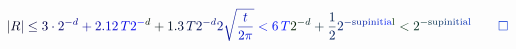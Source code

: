 \documentclass[12pt]{article}
\begin{document}
\makeatletter
\renewcommand*{\@textcolor}[3]{%
  \protect\leavevmode
  \begingroup
    \color#1{#2}#3%
  \endgroup
}
\makeatother
\begin{displaymath}
\mathcolor[RGB]{0,0,15}{|} \mathcolor[RGB]{0,0,30}{R} \mathcolor[RGB]{0,0,45}{|} \mathcolor[RGB]{0,0,60}{\leq} \mathcolor[RGB]{0,0,75}{3} \mathcolor[RGB]{0,0,90}{\cdot} \mathcolor[RGB]{0,0,105}{2} ^ { \mathcolor[RGB]{0,0,120}{-} \mathcolor[RGB]{0,0,135}{d} } \mathcolor[RGB]{0,0,150}{+} \mathcolor[RGB]{0,0,165}{2} \mathcolor[RGB]{0,0,180}{.} \mathcolor[RGB]{0,0,195}{1} \mathcolor[RGB]{0,0,210}{2} \, \mathcolor[RGB]{0,0,225}{T} \mathcolor[RGB]{0,0,240}{2} ^ { \mathcolor[RGB]{0,0,255}{-} \mathcolor[RGB]{0,15,0}{d} } \mathcolor[RGB]{0,15,15}{+} \mathcolor[RGB]{0,15,30}{1} \mathcolor[RGB]{0,15,45}{.} \mathcolor[RGB]{0,15,60}{3} \, \mathcolor[RGB]{0,15,75}{T} \mathcolor[RGB]{0,15,90}{2} ^ { \mathcolor[RGB]{0,15,105}{-} \mathcolor[RGB]{0,15,120}{d} } \mathcolor[RGB]{0,15,135}{2} \mathcolor[RGB]{0,15,150}{\sqrt { \mathcolor[RGB]{0,15,165}{\frac { \mathcolor[RGB]{0,15,180}{t} } { \mathcolor[RGB]{0,15,195}{2} \mathcolor[RGB]{0,15,210}{\pi} } } } } \mathcolor[RGB]{0,15,225}{<} \mathcolor[RGB]{0,15,240}{6} \, \mathcolor[RGB]{0,15,255}{T} \mathcolor[RGB]{0,30,0}{2} ^ { \mathcolor[RGB]{0,30,15}{-} \mathcolor[RGB]{0,30,30}{d} } \mathcolor[RGB]{0,30,45}{+} \mathcolor[RGB]{0,30,60}{\frac { \mathcolor[RGB]{0,30,75}{1} } { \mathcolor[RGB]{0,30,90}{2} } } \mathcolor[RGB]{0,30,105}{2} ^ { \mathcolor[RGB]{0,30,120}{-} \mathrm { \mathcolor[RGB]{0,30,135}{s} \mathcolor[RGB]{0,30,150}{u} \mathcolor[RGB]{0,30,165}{p} \mathcolor[RGB]{0,30,180}{i} \mathcolor[RGB]{0,30,195}{n} \mathcolor[RGB]{0,30,210}{i} \mathcolor[RGB]{0,30,225}{t} \mathcolor[RGB]{0,30,240}{i} \mathcolor[RGB]{0,30,255}{a} \mathcolor[RGB]{0,45,0}{l} } } \mathcolor[RGB]{0,45,15}{<} \mathcolor[RGB]{0,45,30}{2} ^ { \mathcolor[RGB]{0,45,45}{-} \mathrm { \mathcolor[RGB]{0,45,60}{s} \mathcolor[RGB]{0,45,75}{u} \mathcolor[RGB]{0,45,90}{p} \mathcolor[RGB]{0,45,105}{i} \mathcolor[RGB]{0,45,120}{n} \mathcolor[RGB]{0,45,135}{i} \mathcolor[RGB]{0,45,150}{t} \mathcolor[RGB]{0,45,165}{i} \mathcolor[RGB]{0,45,180}{a} \mathcolor[RGB]{0,45,195}{l} } } \mathcolor[RGB]{0,45,210}{\qedhere}
\end{displaymath}
\end{document}
